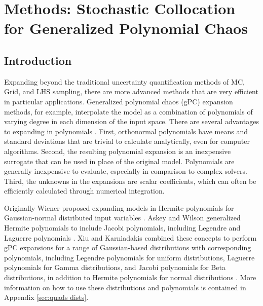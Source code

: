 
\chapter{Methods: Stochastic Collocation for Generalized Polynomial Chaos} %

\label{ch:methods scgpc} %



\section{Introduction}
Expanding beyond the traditional uncertainty quantification methods of MC, Grid, and LHS sampling, there are more
advanced methods that are very efficient in particular applications.
Generalized polynomial chaos (gPC) expansion methods, for example, interpolate the model as a combination of
polynomials of varying degree in each dimension of the input space.  There are several advantages to expanding
in polynomials \cite{xiu}.  First, orthonormal polynomials have means and standard deviations that are trivial to calculate
analytically, even for computer algorithms.  Second, the resulting polynomial expansion is an
inexpensive surrogate that can be used in place of the original model.  Polynomials are generally inexpensive
to evaluate, especially in comparison to complex solvers.  Third, the unknowns in the expansions
are scalar coefficients, which can often be efficiently calculated through numerical integration.

Originally Wiener
proposed expanding models in Hermite polynomials for Gaussian-normal distributed input variables \cite{wiener}.  Askey and
Wilson generalized Hermite polynomials to include Jacobi polynomials, including Legendre and Laguerre
polynomials \cite{Wiener-Askey}.  Xiu and Karniadakis combined these concepts to perform gPC expansions for a 
range of Gaussian-based distributions with corresponding polynomials,
including Legendre polynomials for uniform distributions, Laguerre polynomials for Gamma distributions, and
Jacobi polynomials for Beta distributions, in addition to Hermite polynomials for normal distributions
\cite{xiu}.  More information on how to use these distributions and polynomials is contained in Appendix
\ref{sec:quads dists}.

